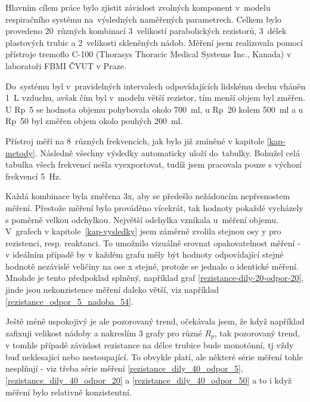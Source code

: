 
Hlavním cílem práce bylo zjistit závislost zvolných komponent v~modelu respiračního systému na~výsledných naměřených parametrech.  Celkem bylo provedeno 20~různých kombinací 3~velikostí parabolických rezistorů, 3~délek plastových trubic a 2~velikosti skleněných nádob. Měření jsem realizovala pomocí přístroje tremoflo C-100 (Thorasys Thoracic Medical Systems Inc., Kanada) v laboratoři FBMI ČVUT v Praze. 


Do~systému byl v~pravidelných intervalech odpovídajících lidskému dechu vháněn \SI{1}{L} vzduchu, avšak čím byl v~modelu větší rezistor,  tím menší objem byl změřen. U Rp~5 se hodnota objemu pohybovala okolo  \SI{700}{ml}, u Rp~20 kolem  \SI{500}{ml} a u Rp~50 byl změřen objem okolo pouhých \SI{200}{ml}.

Přístroj měří na 8~různých frekvencích, jak bylo již zmíněné v kapitole \ref{kap-metody}. Následně všechny výsledky automaticky uloží do~tabulky. 
Bohužel celá tabulka všech frekvencí nešla vyexportovat, tudíž jsem pracovala pouze s výchozí frekvencí  \SI{5}{Hz}. 

Každá kombinace byla změřena 3x, aby se předešlo nežádoucím nepřesnostem měření. Přestože měření bylo prováděno vícekrát, tak hodnoty pokaždé vycházely s poměrně velkou odchylkou. Největší odchylka vznikala u~měření objemu. 
V~grafech v kapitole~\ref{kap-vysledky} jsem záměrně zvolila stejnou osy y pro rezistenci, resp. reaktanci. To umožnilo vizuálně srovnat opakovatelnost měření -  v ideálním případě by v každém grafu měly být hodnoty odpovídající stejné hodnotě nezávislé veličiny na ose x stejné, protože se jednalo o identické měření. Mnohde je tento předpoklad splněný, například graf \ref{rezistance-dily-20-odpor-20}, jinde jsou nekonzistence měření daleko větší, viz například \ref{rezistance_odpor_5_nadoba_54}.

Ještě méně uspokojivý je ale pozorovaný trend, očekávala jsem, že když například zafixuji velikost nádoby a nakreslím 3 grafy pro různé $R_p$, tak pozorovaný trend, v tomhle případě závislost rezistance na délce trubice bude monotónní, tj vždy buď neklesající nebo nestoupající. To obvykle platí, ale některé série měření tohle nesplňují - viz třeba série měření
\ref{rezistance_dily_40_odpor_5}, \ref{rezistance_dily_40_odpor_20} a \ref{rezistance_dily_40_odpor_50} a to i když měření bylo relativně konzistentní.


